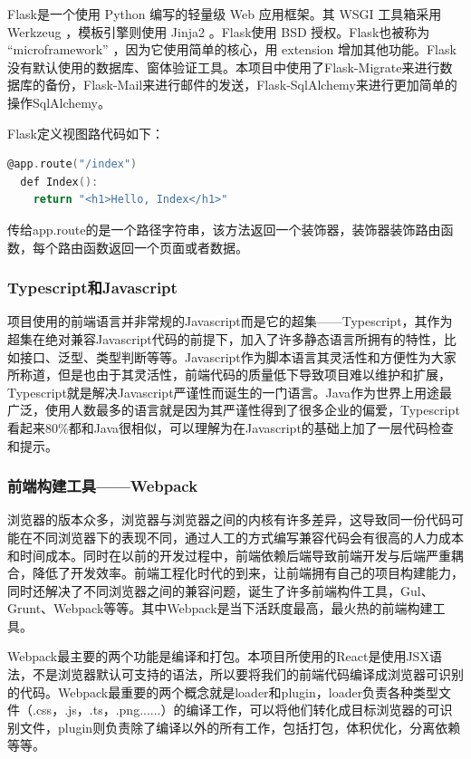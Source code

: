 Flask是一个使用 Python 编写的轻量级 Web 应用框架。其 WSGI 工具箱采用 Werkzeug ，模板引擎则使用 Jinja2 。Flask使用 BSD 授权。Flask也被称为 “microframework” ，因为它使用简单的核心，用 extension 增加其他功能。Flask没有默认使用的数据库、窗体验证工具。本项目中使用了Flask-Migrate来进行数据库的备份，Flask-Mail来进行邮件的发送，Flask-SqlAlchemy来进行更加简单的操作SqlAlchemy。

Flask定义视图路代码如下：
\begin{lstlisting}[language=C]
@app.route("/index")
  def Index():
    return "<h1>Hello, Index</h1>"
\end{lstlisting}

传给app.route的是一个路径字符串，该方法返回一个装饰器，装饰器装饰路由函数，每个路由函数返回一个页面或者数据。

\subsubsection{Typescript和Javascript}

项目使用的前端语言并非常规的Javascript而是它的超集——Typescript，其作为超集在绝对兼容Javascript代码的前提下，加入了许多静态语言所拥有的特性，比如接口、泛型、类型判断等等。Javascript作为脚本语言其灵活性和方便性为大家所称道，但是也由于其灵活性，前端代码的质量低下导致项目难以维护和扩展，Typescript就是解决Javascript严谨性而诞生的一门语言。Java作为世界上用途最广泛，使用人数最多的语言就是因为其严谨性得到了很多企业的偏爱，Typescript看起来80\%都和Java很相似，可以理解为在Javascript的基础上加了一层代码检查和提示。

\subsubsection{前端构建工具——Webpack}

浏览器的版本众多，浏览器与浏览器之间的内核有许多差异，这导致同一份代码可能在不同浏览器下的表现不同，通过人工的方式编写兼容代码会有很高的人力成本和时间成本。同时在以前的开发过程中，前端依赖后端导致前端开发与后端严重耦合，降低了开发效率。前端工程化时代的到来，让前端拥有自己的项目构建能力，同时还解决了不同浏览器之间的兼容问题，诞生了许多前端构件工具，Gul、Grunt、Webpack等等。其中Webpack是当下活跃度最高，最火热的前端构建工具。

Webpack最主要的两个功能是编译和打包。本项目所使用的React是使用JSX语法，不是浏览器默认可支持的语法，所以要将我们的前端代码编译成浏览器可识别的代码。Webpack最重要的两个概念就是loader和plugin，loader负责各种类型文件（.css，.js，.ts，.png......）的编译工作，可以将他们转化成目标浏览器的可识别文件，plugin则负责除了编译以外的所有工作，包括打包，体积优化，分离依赖等等。

